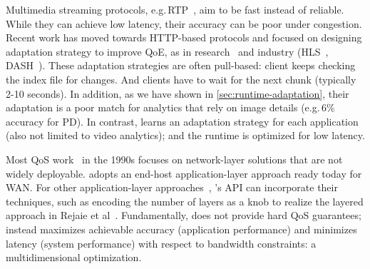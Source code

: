 







 Multimedia streaming protocols,
e.g.\,RTP~\cite{schulzrinne2006rtp}, aim to be fast instead of reliable. While
they can achieve low latency, their accuracy can be poor under congestion.
Recent work has moved towards HTTP-based protocols and focused on designing
adaptation strategy to improve QoE, as in research~\cite{mao2017neural,
  sun2016cs2p, yin2015control} and industry (HLS~\cite{pantos2016http},
DASH~\cite{michalos2012dynamic, sodagar2011mpeg}). These adaptation strategies
are often pull-based: client keeps checking the index file for changes. And
clients have to wait for the next chunk (typically 2-10 seconds). In addition,
as we have shown in \autoref{sec:runtime-adaptation}, their adaptation is a poor
match for analytics that rely on image details (e.g.\,6\% accuracy for PD). In
contrast, \sysname{} learns an adaptation strategy for each application (also
not limited to video analytics); and the runtime is optimized for low latency.

 Most QoS work~\cite{ferrari1990scheme, shenker1994integrated,
  shenker1995fundamental} in the 1990s focuses on network-layer solutions that
are not widely deployable. \sysname{} adopts an end-host application-layer
approach ready today for WAN. For other application-layer
approaches~\cite{vandalore2001survey}, \sysname{}'s API can incorporate their
techniques, such as encoding the number of layers as a knob to realize the
layered approach in Rejaie et al~\cite{rejaie2000layered}. Fundamentally,
\sysname{} does not provide hard QoS guarantees; instead \sysname{} maximizes
achievable accuracy (application performance) and minimizes latency (system
performance) with respect to bandwidth constraints: a multidimensional
optimization.

